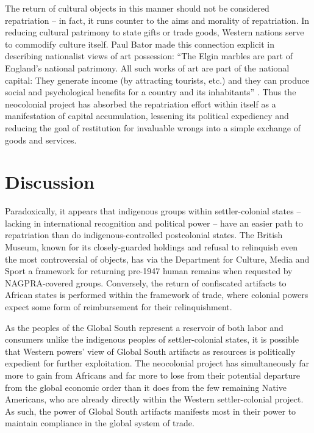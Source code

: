 \documentclass[american]{../../../coursework}
\begin{document}
The return of cultural objects in this manner should not be considered
repatriation -- in fact, it runs counter to the aims and morality of
repatriation. In reducing cultural patrimony to state gifts or trade goods,
Western nations serve to commodify culture itself. Paul Bator made this
connection explicit in describing nationalist views of art possession: ``The
Elgin marbles are part of England's national patrimony. All such works of art
are part of the national capital: They generate income (by attracting
tourists, etc.) and they can produce social and psychological benefits for a
country and its inhabitants'' \parencite[303]{Bat82}. Thus the neocolonial
project has absorbed the repatriation effort within itself as a manifestation
of capital accumulation, lessening its political expediency and reducing the
goal of restitution for invaluable wrongs into a simple exchange of goods and
services.

\section{Discussion}

Paradoxically, it appears that indigenous groups within settler-colonial
states -- lacking in international recognition and political power -- have an
easier path to repatriation than do indigenous-controlled postcolonial states.
The British Museum, known for its closely-guarded holdings and refusal to
relinquish even the most controversial of objects, has via the Department for
Culture, Media and Sport a framework for returning pre-1947 human remains when
requested by NAGPRA-covered groups. Conversely, the return of confiscated
artifacts to African states is performed within the framework of trade, where
colonial powers expect some form of reimbursement for their relinquishment.

As the peoples of the Global South represent a reservoir of both labor and
consumers unlike the indigenous peoples of settler-colonial states, it is
possible that Western powers' view of Global South artifacts as resources is
politically expedient for further exploitation. The neocolonial project has
simultaneously far more to gain from Africans and far more to lose from their
potential departure from the global economic order than it does from the few
remaining Native Americans, who are already directly within the Western
settler-colonial project. As such, the power of Global South artifacts
manifests most in their power to maintain compliance in the global system of
trade.

\printbibliography
\end{document}
